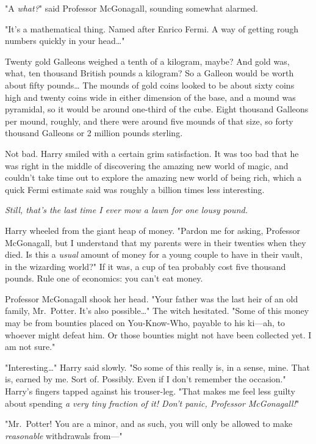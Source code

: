 "A \emph{what?}" said Professor McGonagall, sounding somewhat alarmed.

"It's a mathematical thing. Named after Enrico Fermi. A way of getting rough 
numbers quickly in your head{\ldots}"

Twenty gold Galleons weighed a tenth of a kilogram, maybe? And gold was, what, 
ten thousand British pounds a kilogram? So a Galleon would be worth about fifty 
pounds{\ldots} The mounds of gold coins looked to be about sixty coins high and 
twenty coins wide in either dimension of the base, and a mound was pyramidal, 
so it would be around one-third of the cube. Eight thousand Galleons per mound, 
roughly, and there were around five mounds of that size, so forty thousand 
Galleons or 2 million pounds sterling.

Not bad. Harry smiled with a certain grim satisfaction. It was too bad that he 
was right in the middle of discovering the amazing new world of magic, and 
couldn't take time out to explore the amazing new world of being rich, which a 
quick Fermi estimate said was roughly a billion times less interesting.

\emph{Still, that's the last time I ever mow a lawn for one lousy pound.}

Harry wheeled from the giant heap of money. "Pardon me for asking, Professor 
McGonagall, but I understand that my parents were in their twenties when they 
died. Is this a \emph{usual} amount of money for a young couple to have in 
their vault, in the wizarding world?" If it was, a cup of tea probably cost 
five thousand pounds. Rule one of economics: you can't eat money.

Professor McGonagall shook her head. "Your father was the last heir of an old 
family, Mr.~Potter. It's also possible{\ldots}" The witch hesitated. "Some of 
this money may be from bounties placed on You-Know-Who, payable to his ki---ah, 
to whoever might defeat him. Or those bounties might not have been collected 
yet. I am not sure."

"Interesting{\ldots}" Harry said slowly. "So some of this really is, in a 
sense, mine. That is, earned by me. Sort of. Possibly. Even if I don't remember 
the occasion." Harry's fingers tapped against his trouser-leg. "That makes me 
feel less guilty about spending \emph{a very tiny fraction of it! Don't panic, 
Professor McGonagall!}"

"Mr.~Potter! You are a minor, and as such, you will only be allowed to make 
\emph{reasonable} withdrawals from---"

